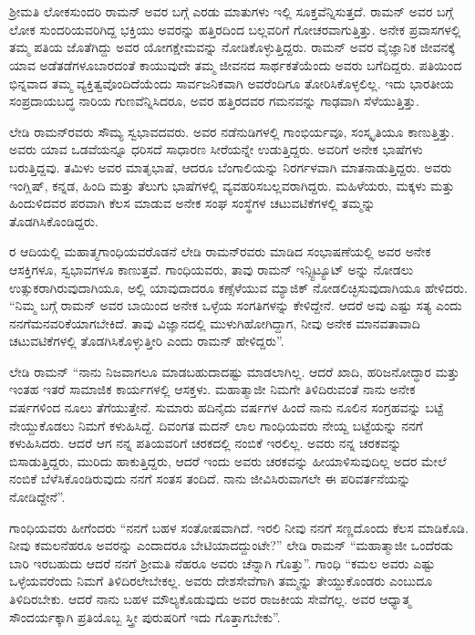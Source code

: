 
\chapter{}


ಶ‍್ರೀಮತಿ ಲೋಕಸುಂದರಿ ರಾಮನ್ ಅವರ ಬಗ್ಗೆ ಎರಡು ಮಾತುಗಳು ಇಲ್ಲಿ ಸೂಕ್ತವೆನ್ನಿಸುತ್ತದೆ. ರಾಮನ್ ಅವರ ಬಗ್ಗೆ ಲೋಕ ಸುಂದರಿಯವರಿಗಿದ್ದ ಭಕ್ತಿಯು ಅವರನ್ನು ಹತ್ತಿರದಿಂದ ಬಲ್ಲವರಿಗೆ ಗೋಚರವಾಗುತ್ತಿತ್ತು. ಅನೇಕ ಪ್ರವಾಸಗಳಲ್ಲಿ ತಮ್ಮ ಪತಿಯ ಜೊತೆಗಿದ್ದು ಅವರ ಯೋಗಕ್ಷೇಮವನ್ನು ನೋಡಿಕೊಳ್ಳುತ್ತಿದ್ದರು. ರಾಮನ್ ಅವರ ವೈಜ್ಞಾನಿಕ ಜೀವನಕ್ಕೆ ಯಾವ ಅಡೆತಡೆಗಳೂ\break ಬಾರದಂತೆ ಕಾಯುವುದೇ ತಮ್ಮ ಜೀವನದ ಸಾರ್ಥಕತೆಯೆಂದು ಅವರು ಬಗೆದಿದ್ದರು. ಪತಿಯಿಂದ ಭಿನ್ನವಾದ ತಮ್ಮ ವ್ಯಕ್ತಿತ್ವವೊಂದಿದೆಯೆಂದು ಸಾರ್ವಜನಿಕವಾಗಿ ಅವರೆಂದಿಗೂ ತೋರಿಸಿಕೊಳ್ಳಲಿಲ್ಲ. ಇದು ಭಾರತೀಯ ಸಂಪ್ರದಾಯಬದ್ಧ ನಾರಿಯ ಗುಣವೆನ್ನಿಸಿದರೂ, ಅವರ ಹತ್ತಿರದವರ ಗಮನವನ್ನು ಗಾಢವಾಗಿ ಸೆಳೆಯುತ್ತಿತ್ತು.

ಲೇಡಿ ರಾಮನ್‍ರವರು ಸೌಮ್ಯ ಸ್ವಭಾವದವರು. ಅವರ ನಡೆನುಡಿಗಳಲ್ಲಿ ಗಾಂಭಿರ್ಯವೂ, ಸಂಸ್ಕೃತಿಯೂ ಕಾಣುತ್ತಿತ್ತು. ಅವರು ಯಾವ ಒಡವೆಯನ್ನೂ ಧರಿಸದೆ ಸಾಧಾರಣ ಸೀರೆಯನ್ನೇ ಉಡುತ್ತಿದ್ದರು. ಅವರಿಗೆ ಅನೇಕ ಭಾಷೆಗಳು ಬರುತ್ತಿದ್ದವು. ತಮಿಳು ಅವರ ಮಾತೃಭಾಷೆ, ಆದರೂ ಬೆಂಗಾಲಿಯನ್ನು ನಿರರ್ಗಳವಾಗಿ ಮಾತನಾಡುತ್ತಿದ್ದರು. ಅವರು ಇಂಗ್ಲಿಷ್, ಕನ್ನಡ, ಹಿಂದಿ ಮತ್ತು ತೆಲುಗು ಭಾಷೆಗಳಲ್ಲಿ ವ್ಯವಹರಿಸಬಲ್ಲವರಾಗಿದ್ದರು. ಮಹಿಳೆಯರು, ಮಕ್ಕಳು ಮತ್ತು ಹಿಂದುಳಿದವರ ಪರವಾಗಿ ಕೆಲಸ ಮಾಡುವ ಅನೇಕ ಸಂಘ ಸಂಸ್ಥೆಗಳ ಚಟುವಟಿಕೆಗಳಲ್ಲಿ ತಮ್ಮನ್ನು ತೊಡಗಿಸಿಕೊಂಡಿದ್ದರು.

ರ ಆದಿಯಲ್ಲಿ ಮಹಾತ್ಮಗಾಂಧಿಯವರೊಡನೆ ಲೇಡಿ ರಾಮನ್‍ರವರು ಮಾಡಿದ ಸಂಭಾಷಣೆಯಲ್ಲಿ ಅವರ ಅನೇಕ ಆಸಕ್ತಿಗಳೂ, ಸ್ವಭಾವಗಳೂ ಕಾಣುತ್ತವೆ. ಗಾಂಧಿಯವರು, ತಾವು ರಾಮನ್ ಇನ್ಸ್ಟಿಟ್ಯೂಟ್ ಅನ್ನು ನೋಡಲು ಉತ್ಸುಕರಾಗಿರುವುದಾಗಿಯೂ, ಅಲ್ಲಿ ಯಾವುದಾದರೂ ಕಣ್ಸೆಳೆಯುವ ಮ್ಯಾಜಿಕ್ ನೋಡಲಿಚ್ಛಿಸುವುದಾಗಿಯೂ ಹೇಳಿದರು. “ನಿಮ್ಮ ಬಗ್ಗೆ ರಾಮನ್ ಅವರ ಬಾಯಿಂದ ಅನೇಕ ಒಳ್ಳೆಯ ಸಂಗತಿಗಳನ್ನು ಕೇಳಿದ್ದೇನೆ. ಆದರೆ ಅವು ಎಷ್ಟು ಸತ್ಯ ಎಂದು ನನಗೆ\break ಮನವರಿಕೆಯಾಗಬೇಕಿದೆ. ತಾವು ವಿಜ್ಞಾನದಲ್ಲಿ ಮುಳುಗಿಹೋಗಿದ್ದಾಗ, ನೀವು ಅನೇಕ ಮಾನವತಾವಾದಿ ಚಟುವಟಿಕೆಗಳಲ್ಲಿ ತೊಡಗಿಸಿಕೊಳ್ಳುತ್ತೀರಿ ಎಂದು ರಾಮನ್ ಹೇಳಿದ್ದರು”.

ಲೇಡಿ ರಾಮನ್ \enginline{-} “ನಾನು ನಿಜವಾಗಲೂ ಮಾಡಬಹುದಾದಷ್ಟು ಮಾಡಲಾಗಿಲ್ಲ. ಆದರೆ ಖಾದಿ, ಹರಿಜನೋದ್ಧಾರ ಮತ್ತು ಇಂತಹ ಇತರೆ ಸಾಮಾಜಿಕ ಕಾರ್ಯಗಳಲ್ಲಿ ಆಸಕ್ತಳು. ಮಹಾತ್ಮಾಜೀ ನಿಮಗೇ ತಿಳಿದಿರುವಂತೆ ನಾನು ಅನೇಕ ವರ್ಷಗಳಿಂದ ನೂಲು ತೆಗೆಯುತ್ತೇನೆ. ಸುಮಾರು ಹದಿನೈದು ವರ್ಷಗಳ ಹಿಂದೆ ನಾನು ನೂಲಿನ ಸಂಗ್ರಹವನ್ನು ಬಟ್ಟೆ ನೇಯ್ದುಕೊಡಲು ನಿಮಗೆ ಕಳುಹಿಸಿದ್ದೆ. ದಿವಂಗತ ಮದನ್ ಲಾಲ ಗಾಂಧಿಯವರು ನೇಯ್ದ ಬಟ್ಟೆಯನ್ನು ನನಗೆ ಕಳುಹಿಸಿದರು. ಆದರೆ ಆಗ ನನ್ನ ಪತಿಯವರಿಗೆ ಚರಕದಲ್ಲಿ ನಂಬಿಕೆ ಇರಲಿಲ್ಲ. ಅವರು ನನ್ನ ಚರಕವನ್ನು ಬಿಸಾಡುತ್ತಿದ್ದರು, ಮುರಿದು ಹಾಕುತ್ತಿದ್ದರು, ಆದರೆ ಇಂದು ಅವರು ಚರಕವನ್ನು ಹೀಯಾಳಿಸುವುದಿಲ್ಲ ಅದರ ಮೇಲೆ ನಂಬಿಕೆ ಬೆಳೆಸಿಕೊಂಡಿರುವುದು ನನಗೆ ಸಂತಸ ತಂದಿದೆ. ನಾನು ಜೀವಿಸಿರುವಾಗಲೇ ಈ ಪರಿವರ್ತನೆಯನ್ನು ನೋಡಿದ್ದೇನೆ”.

ಗಾಂಧಿಯವರು ಹೀಗೆಂದರು “ನನಗೆ ಬಹಳ ಸಂತೋಷವಾಗಿದೆ. ಇರಲಿ ನೀವು ನನಗೆ ಸಣ್ಣದೊಂದು ಕೆಲಸ ಮಾಡಿಕೊಡಿ. ನೀವು ಕಮಲನೆಹರೂ ಅವರನ್ನು ಎಂದಾದರೂ ಬೇಟಿಯಾದದ್ದುಂಟೇ?” ಲೇಡಿ ರಾಮನ್\enginline{-} “ಮಹಾತ್ಮಾಜೀ ಒಂದೆರಡು ಬಾರಿ ಇರಬಹುದು ಆದರೆ ನನಗೆ ಶ‍್ರೀಮತಿ ನೆಹರೂ ಅವರು ಚೆನ್ನಾಗಿ ಗೊತ್ತು”. ಗಾಂಧಿ \enginline{-} “ಕಮಲ ಅವರು ಎಷ್ಟು ಒಳ್ಳೆಯವರೆಂದು ನಿಮಗೆ ತಿಳಿದಿರಲೇಬೇಕಲ್ಲ. ಅವರು ದೇಶಸೇವೆಗಾಗಿ ತಮ್ಮನ್ನು ತೇಯ್ದುಕೊಂಡರು ಎಂಬುದೂ ತಿಳಿದಿರಬೇಕು. ಆದರೆ ನಾನು ಬಹಳ ಮೌಲ್ಯಕೊಡುವುದು ಅವರ ರಾಜಕೀಯ ಸೇವೆಗಲ್ಲ. ಅವರ ಆಧ್ಯಾತ್ಮ ಸೌಂದರ್ಯಕ್ಕಾಗಿ ಪ್ರತಿಯೊಬ್ಬ ಸ್ತ್ರೀ ಪುರುಷರಿಗೆ ಇದು ಗೊತ್ತಾಗಬೇಕು”.

